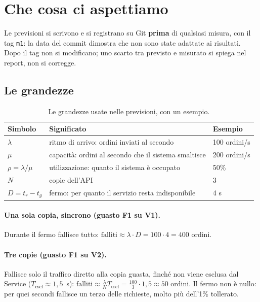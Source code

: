 \section{Che cosa ci aspettiamo}
\label{s:previsioni}

Le previsioni si scrivono e si registrano su Git \textbf{prima} di qualsiasi misura, con il tag \texttt{m1}: la data del commit dimostra che non sono state adattate ai risultati. Dopo il tag non si modificano; uno scarto tra previsto e misurato si spiega nel report, non si corregge.

\subsection{Le grandezze}

\begin{table}[H]
\centering
\caption{Le grandezze usate nelle previsioni, con un esempio.}
\label{tab:grandezze}
\begin{tabularx}{\linewidth}{@{}lLl@{}}
\toprule
\textbf{Simbolo} & \textbf{Significato} & \textbf{Esempio} \\
\midrule
$\lambda$ & ritmo di arrivo: ordini inviati al secondo & 100 ordini/s \\
$\mu$ & capacità: ordini al secondo che il sistema smaltisce & 200 ordini/s \\
$\rho = \lambda / \mu$ & utilizzazione: quanto il sistema è occupato & 50\% \\
$N$ & copie dell'API & 3 \\
$D = t_r - t_g$ & fermo: per quanto il servizio resta indisponibile & 4 s \\
\bottomrule
\end{tabularx}
\end{table}

\paragraph{Una sola copia, sincrono (guasto F1 su V1).} Durante il fermo fallisce tutto: $\text{falliti} \approx \lambda \cdot D = 100 \cdot 4 = 400$ ordini.

\paragraph{Tre copie (guasto F1 su V2).} Fallisce solo il traffico diretto alla copia guasta, finché non viene esclusa dal Service ($T_{\text{escl}} \approx 1{,}5$~s): $\text{falliti} \approx \frac{\lambda}{N} T_{\text{escl}} = \frac{100}{3} \cdot 1{,}5 \approx 50$ ordini. Il fermo non è nullo: per quei secondi fallisce un terzo delle richieste, molto più dell'1\% tollerato.

